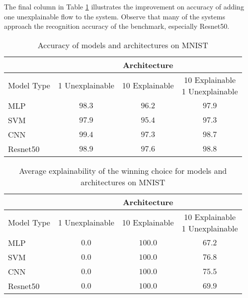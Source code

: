 The final column in Table \ref{tab:mnist_accuracy_results} illustrates the
improvement on accuracy of adding one unexplainable flow to the system.  Observe
that many of the systems approach the recognition accuracy of the benchmark,
especially Resnet50.

\begin{table}
    \renewcommand{\arraystretch}{1.3}
    \caption{Accuracy of models and architectures on MNIST}
    \begin{center}
    \begin{tabular}{|l|c|c|c|}
        \cline{2-4}
        \multicolumn{1}{c|}{} & \multicolumn{3}{c|}{Architecture} \\
        \hline
        Model Type & 1 Unexplainable & 10 Explainable & \parbox[t]{3.3cm}{10 Explainable\\1 Unexplainable}\\
        \hline
        \hline
        MLP & $98.3$ & $96.2$ & $97.9$ \\
        \hline
        SVM & $97.9$ & $95.4$ & $97.3$ \\
        \hline
        CNN & $99.4$ & $97.3$ & $98.7$ \\
        \hline
        Resnet50 & $98.9$ & $97.6$ & $98.8$ \\
        \hline
    \end{tabular}
    \end{center}
    \label{tab:mnist_accuracy_results}
\end{table}

\begin{table}
    \renewcommand{\arraystretch}{1.3}
    \caption{Average explainability of the winning choice for models and architectures on MNIST}
    \begin{center}
    \begin{tabular}{|l|c|c|c|}
        \cline{2-4}
        \multicolumn{1}{c|}{} & \multicolumn{3}{c|}{Architecture} \\
        \hline
        Model Type & 1 Unexplainable & 10 Explainable & \parbox[t]{3.3cm}{10 Explainable\\1 Unexplainable}\\
        \hline
        \hline
        MLP & $0.0$ & $100.0$ & $67.2$ \\
        \hline
        SVM & $0.0$ & $100.0$ & $76.8$ \\
        \hline
        CNN & $0.0$ & $100.0$ & $75.5$ \\
        \hline
        Resnet50 & $0.0$ & $100.0$ & $69.9$ \\
        \hline
    \end{tabular}
    \end{center}
    \label{tab:mnist_explainability_results}
\end{table}

